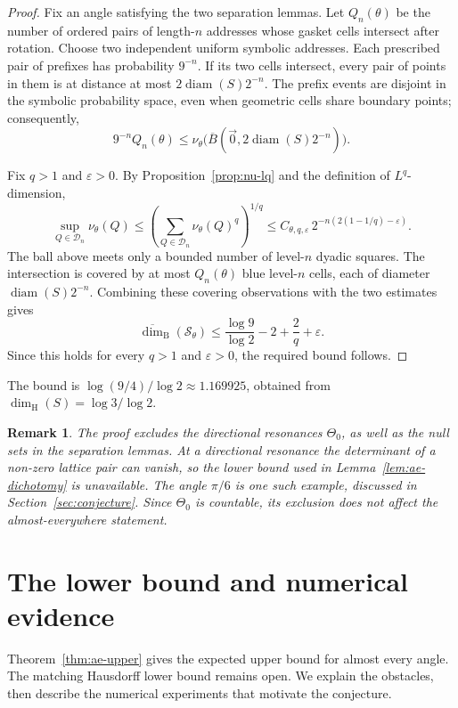 \documentclass[scheme=plain]{ctexart}
\newtheorem{remark}[theorem]{Remark}
\newcommand{\dimhaus}{\dim_\mathrm{H}}
\begin{document}
\begin{proof}
Fix an angle satisfying the two separation lemmas.
Let $Q_n(\theta)$ be the number of ordered pairs of length-$n$ addresses whose gasket cells intersect after rotation.
Choose two independent uniform symbolic addresses.
Each prescribed pair of prefixes has probability $9^{-n}$.
If its two cells intersect, every pair of points in them is at distance at most $2\operatorname{diam}(S)2^{-n}$.
The prefix events are disjoint in the symbolic probability space, even when geometric cells share boundary points; consequently,
\[
9^{-n}Q_n(\theta)
\le\nu_\theta\bigl(\overline B(\vec{0},2\operatorname{diam}(S)2^{-n})\bigr).
\]

Fix $q>1$ and $\varepsilon>0$.
By Proposition~\ref{prop:nu-lq} and the definition of $L^q$-dimension,
\[
\sup_{Q\in\mathcal D_n}\nu_\theta(Q)
\le\left(\sum_{Q\in\mathcal D_n}\nu_\theta(Q)^q\right)^{1/q}
\le C_{\theta,q,\varepsilon}\,2^{-n(2(1-1/q)-\varepsilon)}.
\]
The ball above meets only a bounded number of level-$n$ dyadic squares.
The intersection is covered by at most $Q_n(\theta)$ blue level-$n$ cells, each of diameter $\operatorname{diam}(S)2^{-n}$.
Combining these covering observations with the two estimates gives
\[
\overline{\dim}_{\mathrm B}(\mathcal S_\theta)
\le\frac{\log9}{\log2}-2+\frac2q+\varepsilon.
\]
Since this holds for every $q>1$ and $\varepsilon>0$, the required bound follows.
\end{proof}

The bound is $\log(9/4)/\log2\approx1.169925$, obtained from $\dimhaus(S)=\log3/\log2$.

\begin{remark}
\label{rem:ae-upper-resonance}
The proof excludes the directional resonances $\Theta_0$, as well as the null sets in the separation lemmas.
At a directional resonance the determinant of a non-zero lattice pair can vanish, so the lower bound used in Lemma~\ref{lem:ae-dichotomy} is unavailable.
The angle $\pi/6$ is one such example, discussed in Section~\ref{sec:conjecture}.
Since $\Theta_0$ is countable, its exclusion does not affect the almost-everywhere statement.
\end{remark}

\section{The lower bound and numerical evidence}
\label{sec:ae-lower}

Theorem~\ref{thm:ae-upper} gives the expected upper bound for almost every angle.
The matching Hausdorff lower bound remains open.
We explain the obstacles, then describe the numerical experiments that motivate the conjecture.
\end{document}
